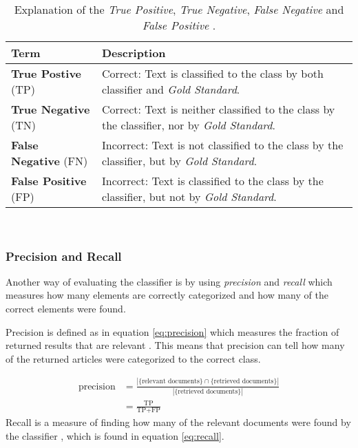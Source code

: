\begin{table}[ht]
\centering
\renewcommand{\arraystretch}{1.25}
\begin{tabularx}{\textwidth}{l |X}
\textbf{Term}  & \textbf{Description} \\\hline
\textbf{True Postive} (TP) & Correct: Text is classified to the class by both classifier and \emph{Gold Standard}. \\ \hline
\textbf{True Negative} (TN) &  Correct: Text is neither classified to the class by the classifier, nor by \emph{Gold Standard}.  \\ \hline
\textbf{False Negative} (FN) & Incorrect: Text is not classified to the class by the classifier, but by \emph{Gold Standard}. \\ \hline
\textbf{False Positive} (FP) & Incorrect: Text is classified to the class by the classifier, but not by \emph{Gold Standard}.
\end{tabularx}
\\[10pt]
\caption[Explanation of the terms: \emph{TP}, \emph{TN}, \emph{FN} and \emph{FP}]{Explanation of the \emph{True Positive}, \emph{True Negative}, \emph{False Negative} and \emph{False Positive} \cite[p.~330-331]{iirbook}.}
\label{tab:retrievedescription}
\end{table}

\subsubsection{Precision and Recall}
Another way of evaluating the classifier is by using \emph{precision} and \emph{recall} which measures how many elements are correctly categorized and how many of the correct elements were found. 


Precision is defined as in equation \ref{eq:precision} %
 which measures the fraction of returned results that are relevant \cite[p.~5]{iirbook}. This means that precision can tell how many of the returned articles were categorized to the correct class. 

\begin{equation} \label{eq:precision} 
\begin{split}
\text{precision} & =\frac{|\{\text{relevant documents}\}\cap\{\text{retrieved documents}\}|}{|\{\text{retrieved documents}\}|} \\
 & = \frac{\text{TP}}{\text{TP} + \text{FP}}
 \end{split}
\end{equation}
Recall is a measure of finding how many of the relevant documents were found by the classifier \cite[p.~5]{iirbook}, which is found in equation \ref{eq:recall}. %

